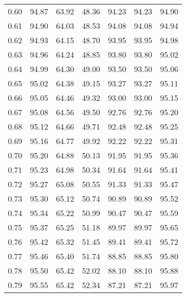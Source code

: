 \begin{tabular}{|c|c|c|c|c|c|c|}
      0.60 &     94.87 &     63.92 &      48.36 &   94.23 &      94.23 &         94.90 \\
      0.61 &     94.90 &     64.03 &      48.53 &   94.08 &      94.08 &         94.94 \\
      0.62 &     94.93 &     64.15 &      48.70 &   93.95 &      93.95 &         94.98 \\
      0.63 &     94.96 &     64.24 &      48.85 &   93.80 &      93.80 &         95.02 \\
      0.64 &     94.99 &     64.30 &      49.00 &   93.50 &      93.50 &         95.06 \\
      0.65 &     95.02 &     64.38 &      49.15 &   93.27 &      93.27 &         95.11 \\
      0.66 &     95.05 &     64.46 &      49.32 &   93.00 &      93.00 &         95.15 \\
      0.67 &     95.08 &     64.56 &      49.50 &   92.76 &      92.76 &         95.20 \\
      0.68 &     95.12 &     64.66 &      49.71 &   92.48 &      92.48 &         95.25 \\
      0.69 &     95.16 &     64.77 &      49.92 &   92.22 &      92.22 &         95.31 \\
      0.70 &     95.20 &     64.88 &      50.13 &   91.95 &      91.95 &         95.36 \\
      0.71 &     95.23 &     64.98 &      50.34 &   91.64 &      91.64 &         95.41 \\
      0.72 &     95.27 &     65.08 &      50.55 &   91.33 &      91.33 &         95.47 \\
      0.73 &     95.30 &     65.12 &      50.74 &   90.89 &      90.89 &         95.52 \\
      0.74 &     95.34 &     65.22 &      50.99 &   90.47 &      90.47 &         95.59 \\
      0.75 &     95.37 &     65.25 &      51.18 &   89.97 &      89.97 &         95.65 \\
      0.76 &     95.42 &     65.32 &      51.45 &   89.41 &      89.41 &         95.72 \\
      0.77 &     95.46 &     65.40 &      51.74 &   88.85 &      88.85 &         95.80 \\
      0.78 &     95.50 &     65.42 &      52.02 &   88.10 &      88.10 &         95.88 \\
      0.79 &     95.55 &     65.42 &      52.34 &   87.21 &      87.21 &         95.97 \\

\end{tabular}
